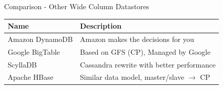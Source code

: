 \documentclass[
  10pt
]{beamer}
\begin{document}
\appendix

\begin{frame}{Comparison - Other Wide Column Datastores}
  \begin{center}
    \begin{tabular}{l|l}
      Name & Description \\
      \hline
      Amazon DynamoDB & Amazon makes the decisions for you \\
      Google BigTable & Based on GFS (CP), Managed by Google \\
      ScyllaDB & Cassandra rewrite with better performance \\
      Apache HBase & Similar data model, master/slave $\rightarrow$ CP\\
    \end{tabular}
  \end{center}
\end{frame}
\end{document}
